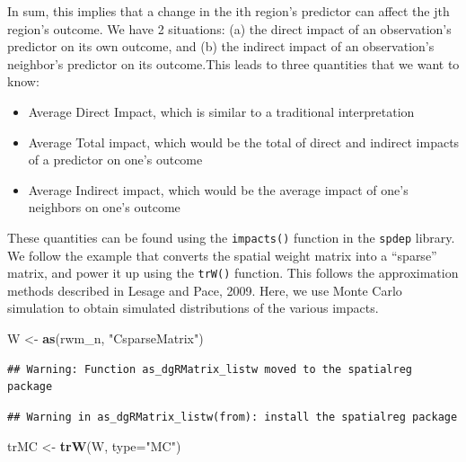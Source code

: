 \documentclass[]{book}
\newenvironment{Shaded}{\begin{snugshade}}{\end{snugshade}}
\newcommand{\DataTypeTok}[1]{\textcolor[rgb]{0.13,0.29,0.53}{#1}}
\newcommand{\KeywordTok}[1]{\textcolor[rgb]{0.13,0.29,0.53}{\textbf{#1}}}
\newcommand{\NormalTok}[1]{#1}
\newcommand{\StringTok}[1]{\textcolor[rgb]{0.31,0.60,0.02}{#1}}
\providecommand{\tightlist}{%
  \setlength{\itemsep}{0pt}\setlength{\parskip}{0pt}}
\begin{document}
In sum, this implies that a change in the ith region's predictor can affect the jth region's outcome. We have 2 situations: (a) the direct impact of an observation's predictor on its own outcome, and (b) the indirect impact of an observation's neighbor's predictor on its outcome.This leads to three quantities that we want to know:

\begin{itemize}
\tightlist
\item
  Average Direct Impact, which is similar to a traditional interpretation
\item
  Average Total impact, which would be the total of direct and indirect impacts of a predictor on one's outcome
\item
  Average Indirect impact, which would be the average impact of one's neighbors on one's outcome
\end{itemize}

These quantities can be found using the \texttt{impacts()} function in the \texttt{spdep} library. We follow the example that converts the spatial weight matrix into a ``sparse'' matrix, and power it up using the \texttt{trW()} function. This follows the approximation methods described in Lesage and Pace, 2009. Here, we use Monte Carlo simulation to obtain simulated distributions of the various impacts.

\begin{Shaded}
\begin{Highlighting}[]
\NormalTok{W <-}\StringTok{ }\KeywordTok{as}\NormalTok{(rwm_n, }\StringTok{"CsparseMatrix"}\NormalTok{)}
\end{Highlighting}
\end{Shaded}

\begin{verbatim}
## Warning: Function as_dgRMatrix_listw moved to the spatialreg package
\end{verbatim}

\begin{verbatim}
## Warning in as_dgRMatrix_listw(from): install the spatialreg package
\end{verbatim}

\begin{Shaded}
\begin{Highlighting}[]
\NormalTok{trMC <-}\StringTok{ }\KeywordTok{trW}\NormalTok{(W, }\DataTypeTok{type=}\StringTok{"MC"}\NormalTok{)}
\end{Highlighting}
\end{Shaded}
\end{document}
